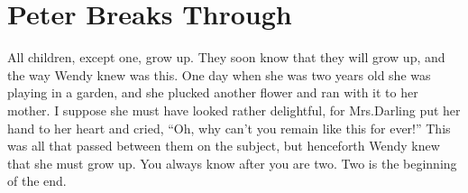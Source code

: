 
\chapter{Peter Breaks Through}

All children, except one, grow up.
They soon know that they will grow up,
and the way Wendy knew was this.
One day when she was two years old she was playing in a garden,
and she plucked another flower and ran with it to her mother.
I suppose she must have looked rather delightful,
for Mrs.\@ Darling put her hand to her heart and cried,
“Oh, why can't you remain like this for ever!”
This was all that passed between them on the subject,
but henceforth Wendy knew that she must grow up.
You always know after you are two.
Two is the beginning of the end.

